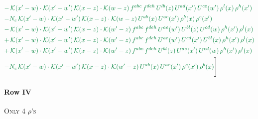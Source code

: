 \documentclass[10pt]{article}
\numberwithin{equation}{section}
\begin{document}
\begin{align}
&{\color{JIM} -\,\mathcal{K}(x'-w)\cdot\mathcal{K}(x'-w')\,\mathcal{K}(x-z)\cdot\mathcal{K}(w-z)\,f^{abc}\,f^{deh}\,U^{lb}(z)\,U^{ad}(x')\,U^{ce}(w')\,\rho^{l}(x)\,\rho^{h}(x')} \notag\\
&{\color{JIM} -N_{c}\,\mathcal{K}(x'-w)\cdot\mathcal{K}(x'-w')\,\mathcal{K}(x-z)\cdot\mathcal{K}(w-z)\,U^{ab}(x)\,U^{ac}(x')\,\rho^{b}(x)\,\rho^{c}(x')} \notag\\
&{\color{JIM} -\,\mathcal{K}(x'-w)\cdot\mathcal{K}(x'-w')\,\mathcal{K}(x-z)\cdot\mathcal{K}(w'-z)\,f^{abc}\,f^{deh}\,U^{ae}(w')\,U^{bl}(z)\,U^{cd}(w)\,\rho^{h}(x')\,\rho^{l}(x)} \notag\\
&{\color{JIM} +\,\mathcal{K}(x'-w)\cdot\mathcal{K}(x'-w')\,\mathcal{K}(x-z)\cdot\mathcal{K}(w'-z)\,f^{abc}\,f^{deh}\,U^{ae}(w')\,U^{cd}(x')\,U^{bl}(x)\,\rho^{h}(x')\,\rho^{l}(x)} \notag\\
&{\color{JIM} +\,\mathcal{K}(x'-w)\cdot\mathcal{K}(x'-w')\,\mathcal{K}(x-z)\cdot\mathcal{K}(w'-z)\,f^{abc}\,f^{deh}\,U^{bl}(z)\,U^{ae}(x')\,U^{cd}(w)\,\rho^{h}(x')\,\rho^{l}(x)} \notag\\
&{\color{JIM} -N_{c}\,\mathcal{K}(x'-w)\cdot\mathcal{K}(x'-w')\,\mathcal{K}(x-z)\cdot\mathcal{K}(w'-z)\,U^{ab}(x)\,U^{ac}(x')\,\rho^{c}(x')\,\rho^{b}(x)}\Bigg] \end{align}
\paragraph{Row IV}
\textsc{Only 4 $\rho$'s}
\end{document}

